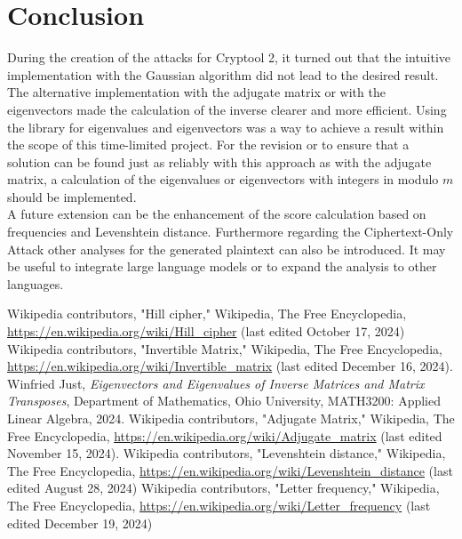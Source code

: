 \documentclass[conference]{IEEEtran}
\begin{document}
\section{Conclusion}

During the creation of the attacks for Cryptool 2, it turned out that the intuitive implementation with the Gaussian algorithm did not lead to the desired result. The alternative implementation with the adjugate matrix or with the eigenvectors made the calculation of the inverse clearer and more efficient. Using the library for eigenvalues and eigenvectors was a way to achieve a result within the scope of this time-limited project. For the revision or to ensure that a solution can be found just as reliably with this approach as with the adjugate matrix, a calculation of the eigenvalues or eigenvectors with integers in modulo \( m \) should be implemented.
\\
A future extension can be the enhancement of the score calculation based on frequencies and Levenshtein distance.
Furthermore regarding the Ciphertext-Only Attack other analyses for the generated plaintext can also be introduced. It may be useful to integrate large language models or to expand the analysis to other languages.
\\

\begin{thebibliography}{9}
 Wikipedia contributors, "Hill cipher," Wikipedia, The Free Encyclopedia, \url{https://en.wikipedia.org/wiki/Hill_cipher} (last edited October 17, 2024)
 Wikipedia contributors, "Invertible Matrix," Wikipedia, The Free Encyclopedia, \url{https://en.wikipedia.org/wiki/Invertible_matrix} (last edited December 16, 2024).
 Winfried Just, \textit{Eigenvectors and Eigenvalues of Inverse Matrices and Matrix Transposes}, Department of Mathematics, Ohio University, MATH3200: Applied Linear Algebra, 2024.
 Wikipedia contributors, "Adjugate Matrix," Wikipedia, The Free Encyclopedia, \url{https://en.wikipedia.org/wiki/Adjugate_matrix} (last edited November 15, 2024).
 Wikipedia contributors, "Levenshtein distance," Wikipedia, The Free Encyclopedia, \url{https://en.wikipedia.org/wiki/Levenshtein_distance} (last edited August 28, 2024)
 Wikipedia contributors, "Letter frequency," Wikipedia, The Free Encyclopedia, \url{https://en.wikipedia.org/wiki/Letter_frequency} (last edited December 19, 2024)
\end{thebibliography}
\end{document}
